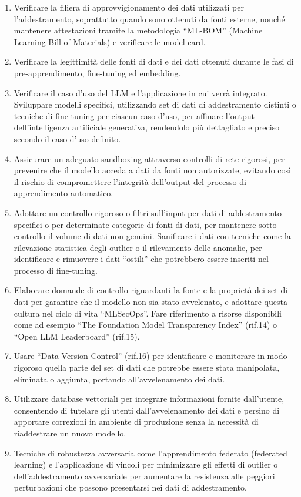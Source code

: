 \documentclass[
]{article}
\providecommand{\tightlist}{%
  \setlength{\itemsep}{0pt}\setlength{\parskip}{0pt}}
\begin{document}
\begin{enumerate}
\def\labelenumi{\arabic{enumi}.}
\tightlist
\item
  Verificare la filiera di approvvigionamento dei dati utilizzati per
  l'addestramento, soprattutto quando sono ottenuti da fonti esterne,
  nonché mantenere attestazioni tramite la metodologia ``ML-BOM''
  (Machine Learning Bill of Materials) e verificare le model card.
\item
  Verificare la legittimità delle fonti di dati e dei dati ottenuti
  durante le fasi di pre-apprendimento, fine-tuning ed embedding.
\item
  Verificare il caso d'uso del LLM e l'applicazione in cui verrà
  integrato. Sviluppare modelli specifici, utilizzando set di dati di
  addestramento distinti o tecniche di fine-tuning per ciascun caso
  d'uso, per affinare l'output dell'intelligenza artificiale generativa,
  rendendolo più dettagliato e preciso secondo il caso d'uso definito.
\item
  Assicurare un adeguato sandboxing attraverso controlli di rete
  rigorosi, per prevenire che il modello acceda a dati da fonti non
  autorizzate, evitando così il rischio di compromettere l'integrità
  dell'output del processo di apprendimento automatico.
\item
  Adottare un controllo rigoroso o filtri sull'input per dati di
  addestramento specifici o per determinate categorie di fonti di dati,
  per mantenere sotto controllo il volume di dati non genuini.
  Sanificare i dati con tecniche come la rilevazione statistica degli
  outlier o il rilevamento delle anomalie, per identificare e rimuovere
  i dati ``ostili'' che potrebbero essere inseriti nel processo di
  fine-tuning.
\item
  Elaborare domande di controllo riguardanti la fonte e la proprietà dei
  set di dati per garantire che il modello non sia stato avvelenato, e
  adottare questa cultura nel ciclo di vita ``MLSecOps''. Fare
  riferimento a risorse disponibili come ad esempio ``The Foundation
  Model Transparency Index'' (rif.14) o ``Open LLM Leaderboard''
  (rif.15).
\item
  Usare ``Data Version Control'' (rif.16) per identificare e monitorare
  in modo rigoroso quella parte del set di dati che potrebbe essere
  stata manipolata, eliminata o aggiunta, portando all'avvelenamento dei
  dati.
\item
  Utilizzare database vettoriali per integrare informazioni fornite
  dall'utente, consentendo di tutelare gli utenti dall'avvelenamento dei
  dati e persino di apportare correzioni in ambiente di produzione senza
  la necessità di riaddestrare un nuovo modello.
\item
  Tecniche di robustezza avversaria come l'apprendimento federato
  (federated learning) e l'applicazione di vincoli per minimizzare gli
  effetti di outlier o dell'addestramento avversariale per aumentare la
  resistenza alle peggiori perturbazioni che possono presentarsi nei
  dati di addestramento.


\end{enumerate}
\end{document}
